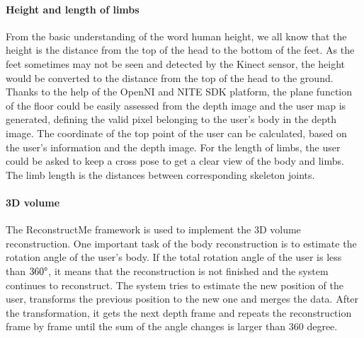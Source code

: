 \paragraph{Height and length of limbs}
From the basic understanding of the word human height, we all know that the height is the distance from the top of the head to the bottom of the feet. 
As the feet sometimes may not be seen and detected by the Kinect sensor, the height would be converted to the distance from the top of the head to the ground.
Thanks to the help of the OpenNI and NITE SDK platform, the plane function of the floor could be easily assessed from the depth image and the user map is generated, defining the valid pixel belonging to the user's body in the depth image.
The coordinate of the top point of the user can be calculated, based on the user's information and the depth image. 
For the length of limbs, the user could be asked to keep a cross pose to get a clear view of the body and limbs. The limb length is the distances between corresponding skeleton joints.

\paragraph{3D volume}
The ReconstructMe framework is used to implement the 3D volume reconstruction.
One important task of the body reconstruction is to estimate the rotation angle of the user's body. If the total rotation angle of the user is less than $360\degree$, it means that the reconstruction is not finished and the system continues to reconstruct. The system tries to estimate the new position of the user, transforms the previous position to the new one and merges the data. After the transformation, it gets the next depth frame and repeats the reconstruction frame by frame until the sum of the angle changes is larger than 360 degree. %

